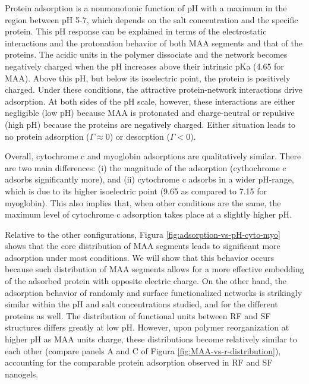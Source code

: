 Protein adsorption is a nonmonotonic function of pH with a maximum in the region between pH 5-7, which depends on the salt concentration and the specific protein.
This pH response can be explained in terms of the electrostatic interactions and the protonation behavior of both MAA segments and that of the proteins.
The acidic units in the polymer dissociate and the network becomes negatively charged when the pH increases above their intrinsic pKa (4.65 for MAA).
Above this pH, but below its isoelectric point, the protein is positively charged.
Under these conditions, the attractive protein-network interactions drive adsorption.
At both sides of the pH scale, however, these interactions are either negligible (low pH) because MAA is protonated and charge-neutral or repulsive (high pH) because the proteins are negatively charged.
Either situation leads to no protein adsorption ($\Gamma\approx 0$) or desorption ($\Gamma< 0$).



Overall, cytochrome c and myoglobin adsorptions are qualitatively similar.
There are two main differences: (i) the magnitude of the adsorption (cythochrome c adsorbs significantly more), and (ii) cytochrome c adsorbs in a wider pH-range, which is due to its higher isoelectric point (9.65 as compared to 7.15 for myoglobin).
This also implies that, when other conditions are the same, the maximum level of cytochrome c adsorption takes place at a slightly higher pH.

Relative to the other configurations, Figura \ref{fig:adsorption-vs-pH-cyto-myo} shows that the core distribution of MAA segments leads to significant more adsorption under most conditions. 
We will show that this behavior occurs because such distribution of MAA segments allows for a more effective embedding of the adsorbed protein with opposite electric charge.
On the other hand, the adsorption behavior of randomly and surface functionalized networks is strikingly similar within the pH and salt concentrations studied, and for the different proteins as well.
The distribution of functional units between RF and SF structures differs greatly at low pH.
However, upon polymer reorganization at higher pH as MAA units charge, these distributions become relatively similar to each other  (compare panels A and C of Figura \ref{fig:MAA-vs-r-distribution}), accounting for the comparable protein adsorption observed in RF and SF nanogels.

 
 




